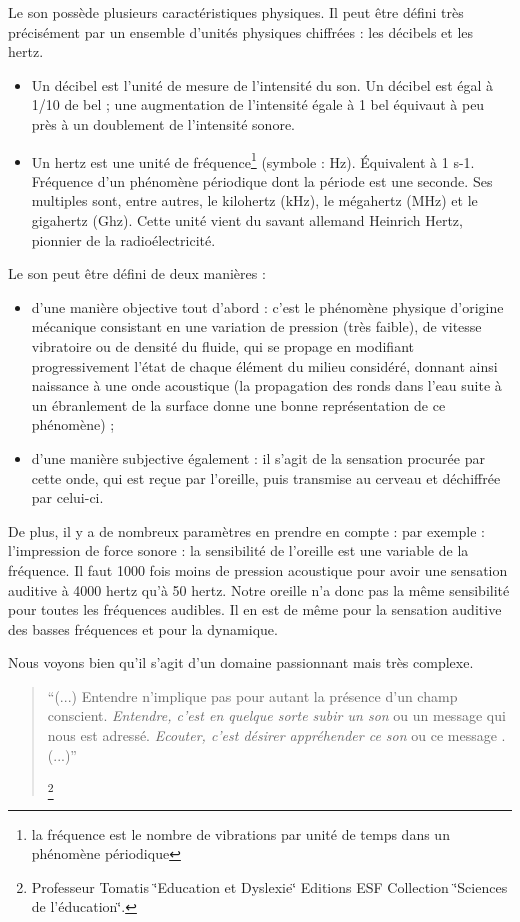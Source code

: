 Le son possède plusieurs caractéristiques physiques. Il peut être
défini très précisément par un ensemble d'unités physiques chiffrées
: les décibels et les hertz. 
\begin{itemize}
\item Un décibel est l'unité de mesure de l'intensité du son. Un décibel
est égal à 1/10 de bel ; une augmentation de l'intensité égale à 1
bel équivaut à peu près à un doublement de l'intensité sonore. 
\item Un hertz est une unité de fréquence\footnote{la fréquence est le nombre de vibrations par unité de temps dans un
phénomène périodique} (symbole : Hz). Équivalent à 1 s-1. Fréquence d'un phénomène périodique
dont la période est une seconde. Ses multiples sont, entre autres,
le kilohertz (kHz), le mégahertz (MHz) et le gigahertz (Ghz). Cette
unité vient du savant allemand Heinrich Hertz, pionnier de la radioélectricité.
\end{itemize}
Le son peut être défini de deux manières : 
\begin{itemize}
\item d'une manière objective tout d'abord : c'est le phénomène physique
d'origine mécanique consistant en une variation de pression (très
faible), de vitesse vibratoire ou de densité du fluide, qui se propage
en modifiant progressivement l'état de chaque élément du milieu considéré,
donnant ainsi naissance à une onde acoustique (la propagation des
ronds dans l'eau suite à un ébranlement de la surface donne une bonne
représentation de ce phénomène) ; 
\item d'une manière subjective également : il s'agit de la sensation procurée
par cette onde, qui est reçue par l'oreille, puis transmise au cerveau
et déchiffrée par celui-ci.
\end{itemize}
De plus, il y a de nombreux paramètres en prendre en compte : par
exemple : l'impression de force sonore : la sensibilité de l'oreille
est une variable de la fréquence. Il faut 1000 fois moins de pression
acoustique pour avoir une sensation auditive à 4000 hertz qu'à 50
hertz. Notre oreille n'a donc pas la même sensibilité pour toutes
les fréquences audibles. Il en est de même pour la sensation auditive
des basses fréquences et pour la dynamique. 

Nous voyons bien qu'il s'agit d'un domaine passionnant mais très complexe.
\begin{quote}
``(...) Entendre n'implique pas pour autant la présence d'un champ
conscient.\emph{ Entendre, c\textquoteright est en quelque sorte subir
un son }ou un message qui nous est adressé. \emph{Ecouter, c'est désirer
appréhender ce son }ou ce message . (...)'' 

\footnote{Professeur Tomatis \char`\"{}Education et Dyslexie\char`\"{} Editions
ESF Collection \char`\"{}Sciences de l'éducation\char`\"{}.}
\end{quote}
